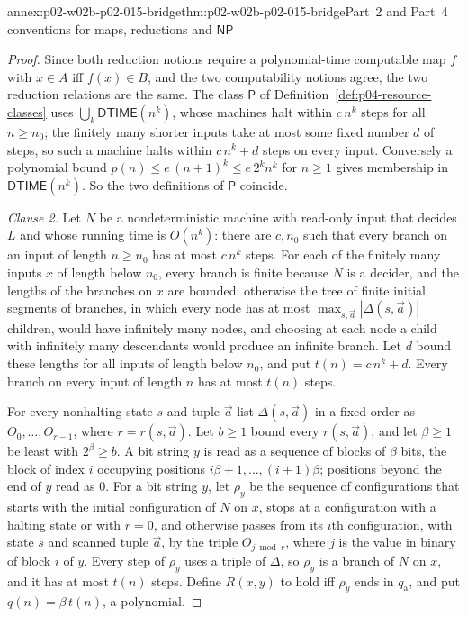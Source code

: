 \begin{annexitem}{annex:p02-w02b-p02-015-bridge}{thm:p02-w02b-p02-015-bridge}{Part~2 and Part~4 conventions for maps, reductions and \(\mathsf{NP}\)}
\begin{proof}
Since both reduction notions require a polynomial-time computable map
\(f\) with \(x\in A\) iff \(f(x)\in B\), and the two computability notions
agree, the two reduction relations are the same.  The class \(\mathsf P\) of
Definition~\ref{def:p04-resource-classes} uses
\(\bigcup_k\mathsf{DTIME}(n^k)\), whose machines halt within \(c\,n^k\) steps
for all \(n\geq n_0\); the finitely many shorter inputs take at most some
fixed number \(d\) of steps, so such a machine halts within \(c\,n^k+d\)
steps on every input.  Conversely a polynomial bound \(p(n)\leq
e\,(n+1)^k\leq e\,2^kn^k\) for \(n\geq1\) gives membership in
\(\mathsf{DTIME}(n^k)\).  So the two definitions of \(\mathsf P\) coincide.

\emph{Clause 2.}  Let \(N\) be a nondeterministic machine with read-only
input that decides \(L\) and whose running time is \(O(n^k)\): there are
\(c,n_0\) such that every branch on an input of length \(n\geq n_0\) has at
most \(c\,n^k\) steps.  For each of the finitely many inputs \(x\) of length
below \(n_0\), every branch is finite because \(N\) is a decider, and the
lengths of the branches on \(x\) are bounded: otherwise the tree of finite
initial segments of branches, in which every node has at most
\(\max_{s,\vec a}|\Delta(s,\vec a)|\) children, would have infinitely many
nodes, and choosing at each node a child with infinitely many descendants
would produce an infinite branch.  Let \(d\) bound these lengths for all
inputs of length below \(n_0\), and put \(t(n)=c\,n^k+d\).  Every branch on
every input of length \(n\) has at most \(t(n)\) steps.

For every nonhalting state \(s\) and tuple \(\vec a\) list
\(\Delta(s,\vec a)\) in a fixed order as \(O_0,\ldots,O_{r-1}\), where
\(r=r(s,\vec a)\).  Let \(b\geq1\) bound every \(r(s,\vec a)\), and let
\(\beta\geq1\) be least with \(2^\beta\geq b\).  A bit string \(y\) is read
as a sequence of blocks of \(\beta\) bits, the block of index \(i\) occupying
positions \(i\beta+1,\ldots,(i+1)\beta\); positions beyond the end of \(y\)
read as \(0\).  For a bit string \(y\), let \(\rho_y\) be the sequence of
configurations that starts with the initial configuration of \(N\) on \(x\),
stops at a configuration with a halting state or with \(r=0\), and otherwise
passes from its \(i\)th configuration, with state \(s\) and scanned tuple
\(\vec a\), by the triple \(O_{j\bmod r}\), where \(j\) is the value in
binary of block \(i\) of \(y\).  Every step of \(\rho_y\) uses a triple of
\(\Delta\), so \(\rho_y\) is a branch of \(N\) on \(x\), and it has at most
\(t(n)\) steps.  Define \(R(x,y)\) to hold iff \(\rho_y\) ends in
\(q_{\mathrm a}\), and put \(q(n)=\beta\,t(n)\), a polynomial.


\end{proof}
\end{annexitem}
